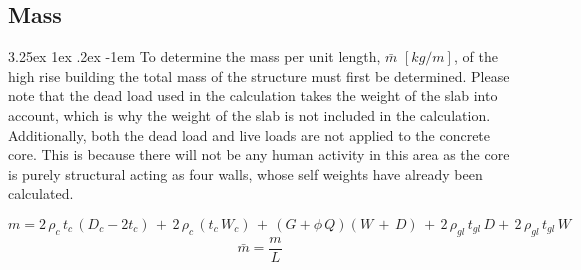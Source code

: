 \documentclass[11pt,a4paper,titlepage]{report}
\makeatletter
\renewcommand\paragraph{\@startsection{paragraph}{5}{\z@}%
  {3.25ex \@plus1ex \@minus.2ex}%
  {-1em}%
  {\normalfont\normalsize\bfseries}}
\makeatother
\begin{document}
\subsection{Mass} 
\paragraph{}To determine the mass per unit length, $\bar{m}$ $[kg/m]$, of the high rise building the total mass of the structure must first be determined. Please note that the dead load used in the calculation takes the weight of the slab into account, which is why the weight of the slab is not included in the calculation. Additionally, both the dead load and live loads are not applied to the concrete core. This is because there will not be any human activity in this area as the core is purely structural acting as four walls, whose self weights have already been calculated. 

\begin{equation}
    m = 2\,\rho_c\,t_c\,(D_c-2t_c)\,+\,2\,\rho_c\,(t_c\,W_c)\,+\,(G+\phi\,Q)(W\,+\,D)\,+\,2\,\rho_{gl}\,t_{gl}\,D+\,2\,\rho_{gl}\,t_{gl}\,W
    \label{eq:I.1 - High Rise Total Mass}
\end{equation}
\begin{equation}
    \bar{m} = \dfrac{m}{L}
    \label{eq:I.1 - High Rise Mass Per Unit}
\end{equation}
\end{document}
